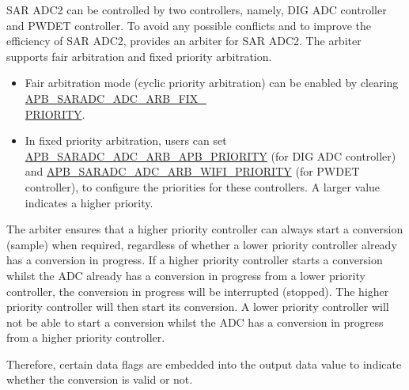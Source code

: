 \documentclass[main\_\_EN.tex]{subfiles}
\begin{document}
SAR ADC2 can be controlled by two controllers, namely, DIG ADC controller and PWDET controller. To avoid any possible conflicts and to improve the efficiency of SAR ADC2, \chipname{} provides an arbiter for SAR ADC2. The arbiter supports fair arbitration and fixed priority arbitration.

\begin{itemize}
    \item Fair arbitration mode (cyclic priority arbitration) can be enabled by clearing  \hyperref[fielddesc:APBSARADCADCARBFIXPRIORITY]{APB\_SARADC\_ADC\_ARB\_FIX\_\\PRIORITY}.
    \item In fixed priority arbitration, users can set \hyperref[fielddesc:APBSARADCADCARBAPBPRIORITY]{APB\_SARADC\_ADC\_ARB\_APB\_PRIORITY} (for DIG ADC controller) and  \hyperref[fielddesc:APBSARADCADCARBWIFIPRIORITY]{APB\_SARADC\_ADC\_ARB\_WIFI\_PRIORITY} (for PWDET controller), to configure the priorities for these controllers.
 A larger value indicates a higher priority.
\end{itemize}


The arbiter ensures that a higher priority controller can always start a conversion (sample) when required, regardless of whether a lower priority controller already has a conversion in progress. If a higher priority controller starts a conversion whilst the ADC already has a conversion in progress from a lower priority controller, the conversion in progress will be interrupted (stopped). The higher priority controller will then start its conversion. A lower priority controller will not be able to start a conversion whilst the ADC has a conversion in progress from a higher priority controller.  

Therefore, certain data flags are embedded into the output data value to indicate whether the conversion is valid or not.
\end{document}
